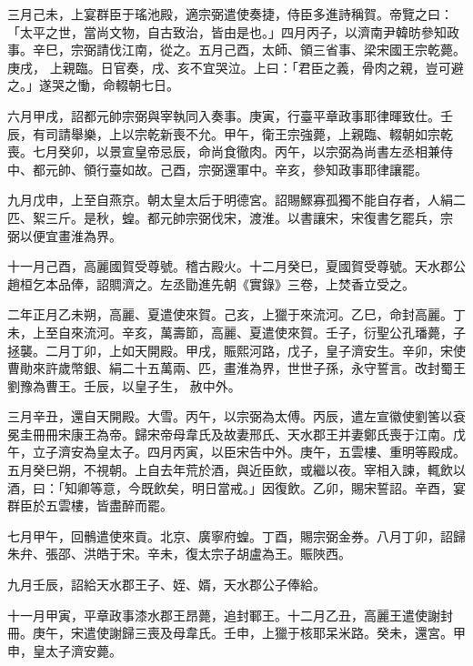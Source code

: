 \begin{pinyinscope}
 三月己未，上宴群臣于瑤池殿，適宗弼遣使奏捷，侍臣多進詩稱賀。帝覽之曰：「太平之世，當尚文物，自古致治，皆由是也。」四月丙子，以濟南尹韓昉參知政事。辛巳，宗弼請伐江南，從之。五月己酉，太師、領三省事、梁宋國王宗乾薨。庚戌，
 上親臨。日官奏，戌、亥不宜哭泣。上曰：「君臣之義，骨肉之親，豈可避之。」遂哭之慟，命輟朝七日。



 六月甲戌，詔都元帥宗弼與宰執同入奏事。庚寅，行臺平章政事耶律暉致仕。壬辰，有司請舉樂，上以宗乾新喪不允。甲午，衛王宗強薨，上親臨、輟朝如宗乾喪。七月癸卯，以景宣皇帝忌辰，命尚食徹肉。丙午，以宗弼為尚書左丞相兼侍中、都元帥、領行臺如故。己酉，宗弼還軍中。辛亥，參知政事耶律讓罷。



 九月戊申，上至自燕京。朝太皇太后于明德宮。詔賜鰥寡孤獨不能自存者，人絹二匹、絮三斤。是秋，蝗。都元帥宗弼伐宋，渡淮。以書讓宋，宋復書乞罷兵，宗
 弼以便宜畫淮為界。



 十一月己酉，高麗國賀受尊號。稽古殿火。十二月癸巳，夏國賀受尊號。天水郡公趙桓乞本品俸，詔賙濟之。左丞勖進先朝《實錄》三卷，上焚香立受之。



 二年正月乙未朔，高麗、夏遣使來賀。己亥，上獵于來流河。乙巳，命封高麗。丁未，上至自來流河。辛亥，萬壽節，高麗、夏遣使來賀。壬子，衍聖公孔璠薨，子拯襲。二月丁卯，上如天開殿。甲戌，賑熙河路，戊子，皇子濟安生。辛卯，宋使曹勛來許歲幣銀、絹二十五萬兩、匹，畫淮為界，世世子孫，永守誓言。改封蜀王劉豫為曹王。壬辰，以皇子生，
 赦中外。



 三月辛丑，還自天開殿。大雪。丙午，以宗弼為太傅。丙辰，遣左宣徽使劉筈以袞冕圭冊冊宋康王為帝。歸宋帝母韋氏及故妻邢氏、天水郡王并妻鄭氏喪于江南。戊午，立子濟安為皇太子。四月丙寅，以臣宋告中外。庚午，五雲樓、重明等殿成。五月癸巳朔，不視朝。上自去年荒於酒，與近臣飲，或繼以夜。宰相入諫，輒飲以酒，曰：「知卿等意，今既飲矣，明日當戒。」因復飲。乙卯，賜宋誓詔。辛酉，宴群臣於五雲樓，皆盡醉而罷。



 七月甲午，回鶻遣使來貢。北京、廣寧府蝗。丁酉，賜宗弼金券。八月丁卯，詔歸朱弁、張邵、洪皓于宋。辛未，復太宗子胡盧為王。賑陜西。



 九月壬辰，詔給天水郡王子、姪、婿，天水郡公子俸給。



 十一月甲寅，平章政事漆水郡王昂薨，追封鄆王。十二月乙丑，高麗王遣使謝封冊。庚午，宋遣使謝歸三喪及母韋氏。壬申，上獵于核耶呆米路。癸未，還宮。甲申，皇太子濟安薨。




\end{pinyinscope}
